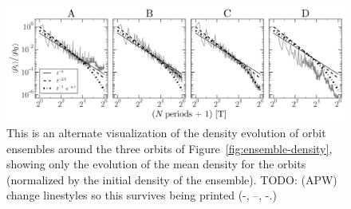 \documentclass[letterpaper,12pt,preprint]{aastex}
\newcommand{\todo}[2]{{\color{red} TODO: (\MakeUppercase{#1}) #2}}
\begin{document}
\clearpage
\begin{figure}[p]
\begin{center}
\includegraphics[width=\textwidth]{figures/ensemble-densities.png}
\caption{This is an alternate visualization of the density evolution of orbit ensembles around the three orbits of Figure~\ref{fig:ensemble-density}, showing only the evolution of the mean density for the orbits (normalized by the initial density of the ensemble). \todo{apw}{change linestyles so this survives being printed (-, --, -.)}} 
\label{fig:densities}
\end{center}
\end{figure}
\end{document}

